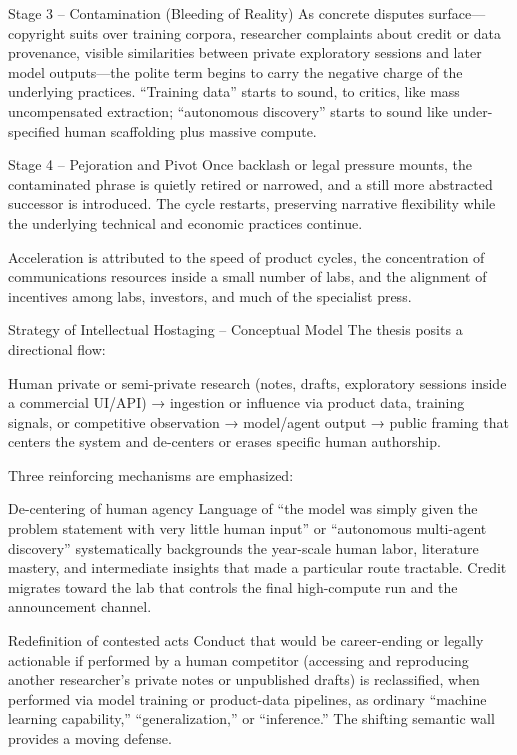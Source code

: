 Stage 3 – Contamination (Bleeding of Reality)  
As concrete disputes surface—copyright suits over training corpora, researcher complaints about credit or data provenance, visible similarities between private exploratory sessions and later model outputs—the polite term begins to carry the negative charge of the underlying practices. “Training data” starts to sound, to critics, like mass uncompensated extraction; “autonomous discovery” starts to sound like under-specified human scaffolding plus massive compute.

Stage 4 – Pejoration and Pivot  
Once backlash or legal pressure mounts, the contaminated phrase is quietly retired or narrowed, and a still more abstracted successor is introduced. The cycle restarts, preserving narrative flexibility while the underlying technical and economic practices continue.

Acceleration is attributed to the speed of product cycles, the concentration of communications resources inside a small number of labs, and the alignment of incentives among labs, investors, and much of the specialist press.

Strategy of Intellectual Hostaging – Conceptual Model
The thesis posits a directional flow:

Human private or semi-private research (notes, drafts, exploratory sessions inside a commercial UI/API) → ingestion or influence via product data, training signals, or competitive observation → model/agent output → public framing that centers the system and de-centers or erases specific human authorship.

Three reinforcing mechanisms are emphasized:

De-centering of human agency  
   Language of “the model was simply given the problem statement with very little human input” or “autonomous multi-agent discovery” systematically backgrounds the year-scale human labor, literature mastery, and intermediate insights that made a particular route tractable. Credit migrates toward the lab that controls the final high-compute run and the announcement channel.

Redefinition of contested acts  
   Conduct that would be career-ending or legally actionable if performed by a human competitor (accessing and reproducing another researcher’s private notes or unpublished drafts) is reclassified, when performed via model training or product-data pipelines, as ordinary “machine learning capability,” “generalization,” or “inference.” The shifting semantic wall provides a moving defense.

